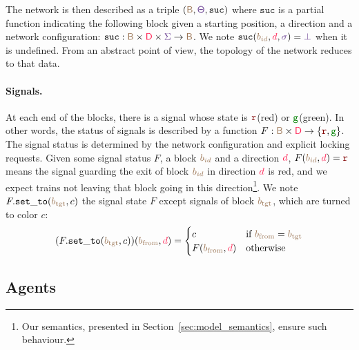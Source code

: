\documentclass[runningheads]{llncs}
\newcommand{\directions}{\dirFmt{\mathsf{D}}}
\newcommand{\sucblock}{{\mathtt{suc}}}
\newcommand{\dirFmt}[1]{{\color{dircolor} #1}}
\newcommand{\posFmt}[1]{{\color{poscolor}{#1}}}
\newcommand{\blocks}{{\posFmt{\mathsf{B}}}}
\newcommand{\bid}[1]{\ensuremath{\posFmt{b_{#1}}}}
\newcommand{\suc}[3]{\ensuremath{\sucblock(\posFmt{#1}, \dirFmt{#2}, \swFmt{#3})}}
\newcommand{\swFmt}[1]{{\color{swcolor}{#1}}}
\newcommand{\turnouts}{\swFmt{\mathsf{\Theta}}}
\newcommand{\switches}{\ensuremath{\swFmt{\sigma}}}
\newcommand{\networkConf}{\ensuremath{\swFmt{\Sigma}}}
\newcommand{\nosuc}{\ensuremath{\swFmt{\bot}}}
\newcommand{\sigred}{{\mbox{${\color{red!50!black}\mathtt{r}}$}}\xspace}
\newcommand{\siggreen}{{\mbox{${\color{green!50!black}\mathtt{g}}$}}\xspace}
\newcommand{\signalF}[2]{\ensuremath{\signals(\posFmt{#1}, \dirFmt{#2})}}
\newcommand{\signals}{\ensuremath{F}}
\newcommand{\setSignalsTo}[2]{\signals.{\tt set\_to}(#1, #2)}
\begin{document}
The network is then described as a triple $(\blocks, \turnouts, \sucblock)$ where $\sucblock$ is a partial function indicating the following block given a starting position, a direction and a network configuration: $\sucblock: \blocks\times \directions \times \networkConf \to \blocks$. We note $\suc{\bid{id}}{d}{\switches} = \nosuc$ when it is undefined. From an abstract point of view, the topology of the network reduces to that data.  


\paragraph{Signals.}
At each end of the blocks, there is a signal whose state is \sigred (red) or \siggreen (green). In other words, the status of signals is described by a function $\signals: \blocks \times \directions \to \{ \sigred, \siggreen\}$. The signal status is determined by the network configuration and explicit locking requests. Given some signal status $\signals$, a block $\bid{id}$ and a direction $\dirFmt{d}$, $\signalF{\bid{id}}{d} = \sigred$ means the signal guarding the exit of block $\bid{id}$ in direction $\dirFmt{d}$ is red, and we expect trains not leaving that block going in this direction\footnote{Our semantics, presented in Section~\ref{sec:model_semantics}, ensure such behaviour.}. We note $\setSignalsTo{\bid{\text{tgt}}}{c}$ the signal state $\signals$ except signals of block \bid{\text{tgt}}, which are turned to color $c$: 
$$(\setSignalsTo{\bid{\text{tgt}}}{c})(\bid{\text{from}}, \dirFmt{d}) = \begin{cases}
	c & \text{if }\bid{\text{from}} = \bid{\text{tgt}}\\
	\signalF{\bid{\text{from}}}{d} & \text{otherwise}
\end{cases}$$


\subsection{Agents}
\end{document}
